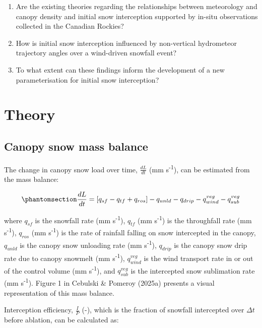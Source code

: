 \documentclass[
  letterpaper,
]{tex/uofsthesis-cs}
\begin{document}
\begin{enumerate}
\def\labelenumi{\arabic{enumi}.}
\item
  Are the existing theories regarding the relationships between
  meteorology and canopy density and initial snow interception supported
  by in-situ observations collected in the Canadian Rockies?
\item
  How is initial snow interception influenced by non-vertical
  hydrometeor trajectory angles over a wind-driven snowfall event?
\item
  To what extent can these findings inform the development of a new
  parameterisation for initial snow interception?
\end{enumerate}

\section{Theory}\label{theory}

\subsection{Canopy snow mass balance}\label{canopy-snow-mass-balance}

The change in canopy snow load over time, \(\frac{dL}{dt}\) (mm
s\textsuperscript{-1}), can be estimated from the mass balance:

\begin{equation}\phantomsection\label{eq-canopy-mass-bal}{
\frac{dL}{dt} = 
[q_{sf} - q_{tf} + q_{ros}] - q_{unld} - q_{drip} - q_{wind}^{veg} - q_{sub}^{veg}
}\end{equation}

where \(q_{sf}\) is the snowfall rate (mm s\textsuperscript{-1}),
\(q_{tf}\) (mm s\textsuperscript{-1}) is the throughfall rate (mm
s\textsuperscript{-1}), \(q_{ros}\) (mm s\textsuperscript{-1}) is the
rate of rainfall falling on snow intercepted in the canopy, \(q_{unld}\)
is the canopy snow unloading rate (mm s\textsuperscript{-1}),
\(q_{drip}\) is the canopy snow drip rate due to canopy snowmelt (mm
s\textsuperscript{-1}), \(q_{wind}^{veg}\) is the wind transport rate in
or out of the control volume (mm s\textsuperscript{-1}), and
\(q_{sub}^{veg}\) is the intercepted snow sublimation rate (mm
s\textsuperscript{-1}). Figure 1 in Cebulski \& Pomeroy (2025a) presents
a visual representation of this mass balance.

Interception efficiency, \(\frac{I}{P}\) (-), which is the fraction of
snowfall intercepted over \(\Delta t\) before ablation, can be
calculated as:
\end{document}
